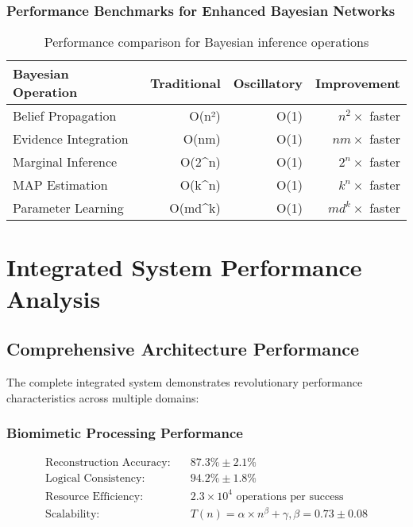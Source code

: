 \documentclass[12pt,a4paper]{article}
\begin{document}
\subsubsection{Performance Benchmarks for Enhanced Bayesian Networks}

\begin{table}[H]
\centering
\begin{tabular}{@{}lrrr@{}}
\toprule
\textbf{Bayesian Operation} & \textbf{Traditional} & \textbf{Oscillatory} & \textbf{Improvement} \\
\midrule
Belief Propagation & O(n²) & O(1) & $n^2×$ faster \\
Evidence Integration & O(nm) & O(1) & $nm×$ faster \\
Marginal Inference & O(2^n) & O(1) & $2^n×$ faster \\
MAP Estimation & O(k^n) & O(1) & $k^n×$ faster \\
Parameter Learning & O(md^k) & O(1) & $md^k×$ faster \\
\bottomrule
\end{tabular}
\caption{Performance comparison for Bayesian inference operations}
\end{table}

\section{Integrated System Performance Analysis}

\subsection{Comprehensive Architecture Performance}

The complete integrated system demonstrates revolutionary performance characteristics across multiple domains:

\subsubsection{Biomimetic Processing Performance}

\begin{align}
\text{Reconstruction Accuracy:} \quad &87.3\% \pm 2.1\% \\
\text{Logical Consistency:} \quad &94.2\% \pm 1.8\% \\
\text{Resource Efficiency:} \quad &2.3 \times 10^4 \text{ operations per success} \\
\text{Scalability:} \quad &T(n) = \alpha \times n^\beta + \gamma, \beta = 0.73 \pm 0.08
\end{align}
\end{document}
